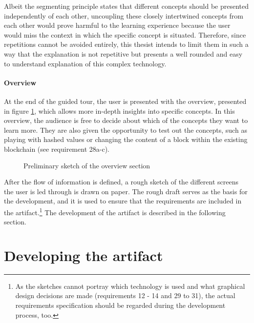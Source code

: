 Albeit the segmenting principle states that different concepts should be presented independently of each other, uncoupling these closely intertwined concepts from each other would prove harmful to the learning experience because the user would miss the context in which the specific concept is situated. Therefore, since repetitions cannot be avoided entirely, this thesist intends to limit them in such a way that the explanation is not repetitive but presents a well rounded and easy to understand explanation of this complex technology.

\paragraph{Overview} At the end of the guided tour, the user is presented with the overview, presented in figure \ref{fig:OverviewPic}, which allows more in-depth insights into specific concepts.
In this overview, the audience is free to decide about which of the concepts they want to learn more. They are also given the opportunity to test out the concepts, such as playing with hashed values or changing the content of a block within the existing blockchain (see requirement 28a-c).

\begin{figure}
    \centering
    
    \caption{Preliminary sketch of the overview section}
    \label{fig:OverviewPic}
\end{figure}

After the flow of information is defined, a rough sketch of the different screens the user is led through is drawn on paper. The rough draft serves as the basis for the development, and it is used to ensure that the requirements are included in the artifact.\footnote{As the sketches cannot portray which technology is used and what graphical design decisions are made (requirements 12 - 14 and 29 to 31), the actual requirements specification should be regarded during the development process, too.} The development of the artifact is described in the following section.

\section{Developing the artifact}

